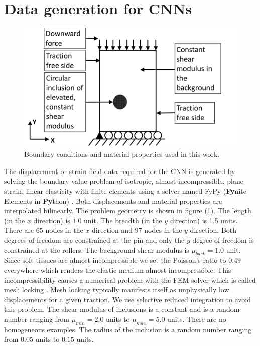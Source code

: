 \documentclass[12pt]{article}
\begin{document}
\section{\label{sect:probsetup}Data generation for CNNs}
%
\begin{figure}[!h] 
   \centering
    \includegraphics[totalheight=5cm]{Figures/bc.png}
  \caption{\label{fig:bc}Boundary conditions and material properties used in this work. }
\end{figure}
%
The displacement or strain field data required for the CNN is generated by solving the boundary value problem of isotropic, almost incompressible, plane strain, linear elasticity \cite{book:segelmathcont} with finite elements \cite{book:hugheslinear,book:fishbelytschko} using a solver named FyPy (\textbf{Fy}nite Elements in \textbf{Py}thon) \cite{misc:fypy}. Both displacements and material properties are interpolated bilinearly. The problem geometry is shown in figure (\ref{fig:bc}). The length (in the $x$ direction) is $1.0$ unit. The breadth (in the $y$ direction) is 1.5 units. There are $65$ nodes in the $x$ direction and $97$ nodes in the $y$ direction. Both degrees of freedom are constrained at the pin and only the $y$ degree of freedom is constrained at the rollers. The background shear modulus is $\mu_{back}=1.0$ unit. Since soft tissues are almost incompressible we set the Poisson's ratio to $0.49$ everywhere which renders the elastic medium almost incompressible. This incompressibility causes a numerical problem with the FEM solver which is called mesh locking \cite{book:hugheslinear}. Mesh locking typically manifests itself as unphysically low displacements for a given traction. We use selective reduced integration \cite{book:hugheslinear} to avoid this problem. The shear modulus of inclusions is a constant and is a random number ranging from $\mu_{min}=2.0$ units to $\mu_{max}=5.0$ units. There are no homogeneous examples. The radius of the inclusion is a random number ranging from $0.05$ units to $0.15$ units.
\end{document}

